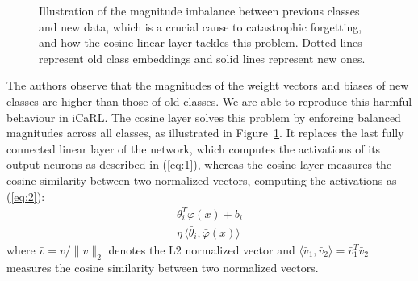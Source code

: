 \documentclass[10pt,twocolumn,letterpaper]{article}
\begin{document}
\begin{figure}
\begin{center}
\end{center}
\caption{Illustration of the magnitude imbalance between previous classes and new data, which is a crucial cause to catastrophic forgetting, and how the cosine linear layer tackles this problem. Dotted lines represent old class embeddings and solid lines represent new ones.}
\label{fig:classifier:cosine:features}
\end{figure}

The authors observe that the magnitudes of the weight vectors and biases of new classes are higher than those of old classes. We are able to reproduce this harmful behaviour in iCaRL. The cosine layer solves this problem by enforcing balanced magnitudes across all classes, as illustrated in Figure~\ref{fig:classifier:cosine:features}. It replaces the last fully connected linear layer of the network, which computes the activations of its output neurons as described in (\ref{eq:1}), whereas the cosine layer measures the cosine similarity between two normalized vectors, computing the activations as (\ref{eq:2}):
\begin{align}
    \theta_{i}^{T} \varphi(x) + b_{i} \label{eq:1}\\
    \eta \, \langle \bar{\theta}_{i}, \bar{\varphi}(x) \rangle \label{eq:2}
\end{align}
where $\bar{v} = v/\lVert v \rVert_{2}$ denotes the L2 normalized vector and $\langle \bar{v}_{1}, \bar{v}_{2} \rangle = \bar{v}_{1}^{T} \bar{v}_{2}$ measures the cosine similarity between two normalized vectors.
\end{document}

